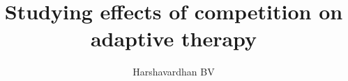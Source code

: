 \documentclass[twoside, 12pt]{iiser-thesis}
\title{Studying effects of competition on adaptive therapy}
\author{Harshavardhan BV }
\begin{document}
	\thesisfront







%

\printbibliography
\end{document}
